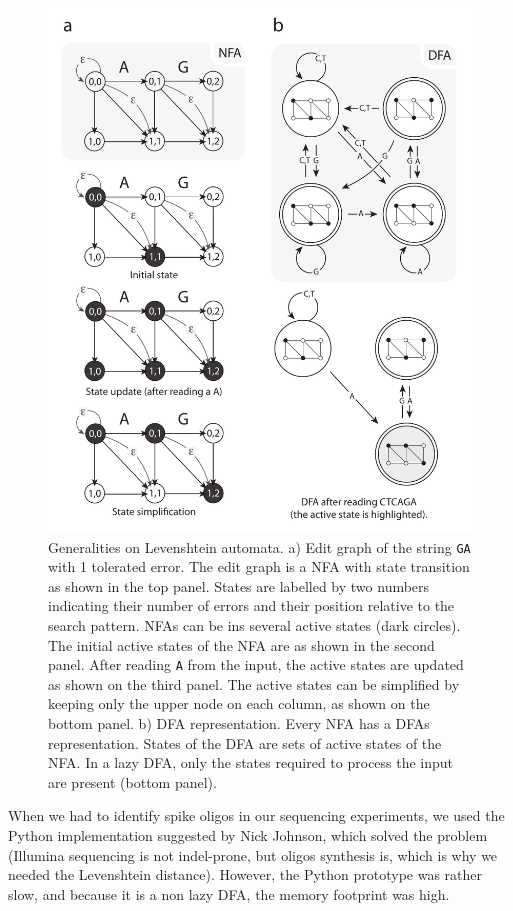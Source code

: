 \documentclass[12pt]{article}
\begin{document}
\begin{figure}[!tpb]
\centerline{\includegraphics[scale=.6]{edit_matrix.pdf}}
\caption{Generalities on Levenshtein automata. a) Edit graph
of the string \texttt{GA} with 1 tolerated error. The edit graph
is a NFA with state transition as shown in the top panel. States
are labelled by two numbers indicating their number of errors and
their position relative to the search pattern. NFAs can be ins
several active states (dark circles). The initial active states
of the NFA are as shown in the second panel. After reading
\texttt{A} from the input, the active states are updated as shown
on the third panel. The active states can be simplified by keeping
only the upper node on each column, as shown on the bottom panel.
b) DFA representation. Every NFA has a DFAs representation.
States of the DFA are sets of active states of the NFA. In a
lazy DFA, only the states required to process the input are present
(bottom panel).
}\label{generalities}
\end{figure}

When we had to identify spike oligos in our
sequencing experiments, we used the Python implementation suggested
by Nick Johnson, which solved the problem (Illumina sequencing is
not indel-prone, but oligos synthesis is, which is why we needed
the Levenshtein distance). However, the Python prototype was rather
slow, and because it is a non lazy DFA, the memory footprint was high.
\end{document}
